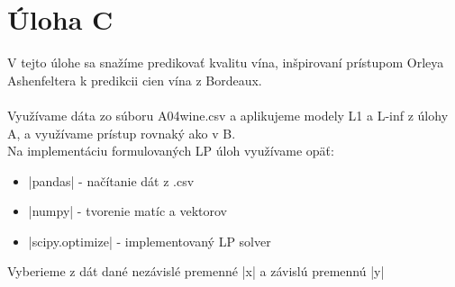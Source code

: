 \documentclass[12pt,oneside,a4paper,slovak]{article}
\begin{document}
   

\section*{Úloha C}
V tejto úlohe sa snažíme predikovať kvalitu vína, inšpirovaní prístupom Orleya Ashenfeltera k predikcii cien vína z Bordeaux.
\\
\\
Využívame dáta zo súboru A04wine.csv a aplikujeme modely L1 a L-inf z úlohy A, a využívame prístup rovnaký ako v B.
\\
Na implementáciu formulovaných LP úloh využívame opäť:
\begin{itemize}
	\item \pyth|pandas| - načítanie dát z .csv
	\item \pyth|numpy| - tvorenie matíc a vektorov
	\item \pyth|scipy.optimize| - implementovaný LP solver
\end{itemize}

Vyberieme z dát dané nezávislé premenné \pyth|x| a závislú premennú \pyth|y|
\end{document}
